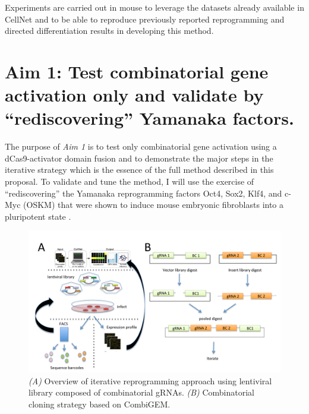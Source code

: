 \documentclass[10pt]{article}
\begin{document}

Experiments are carried out in mouse to leverage the datasets already available in CellNet \cite{cahan2014cellnet} and to be able to reproduce previously reported reprogramming and directed differentiation results in developing this method.

\section{Aim 1: Test combinatorial gene activation only and validate by ``rediscovering'' Yamanaka factors.}

The purpose of \textit{Aim 1} is to test only combinatorial gene activation using a dCas9-activator domain fusion and to demonstrate the major steps in the iterative strategy which is the essence of the full method described in this proposal. To validate and tune the method, I will use the exercise of ``rediscovering'' the Yamanaka reprogramming factors Oct4, Sox2, Klf4, and c-Myc (OSKM) that were shown to induce mouse embryonic fibroblasts into a pluripotent state \cite{takahashi2006induction}.

\begin{figure}
\centering
\includegraphics[width=\textwidth]{fig1}
\caption{\textit{(A)} Overview of iterative reprogramming approach using lentiviral library composed of combinatorial gRNAs. \textit{(B)} Combinatorial cloning strategy based on CombiGEM\cite{cheng2014enhanced}.}
\label{fig1}
\end{figure}
\end{document}
